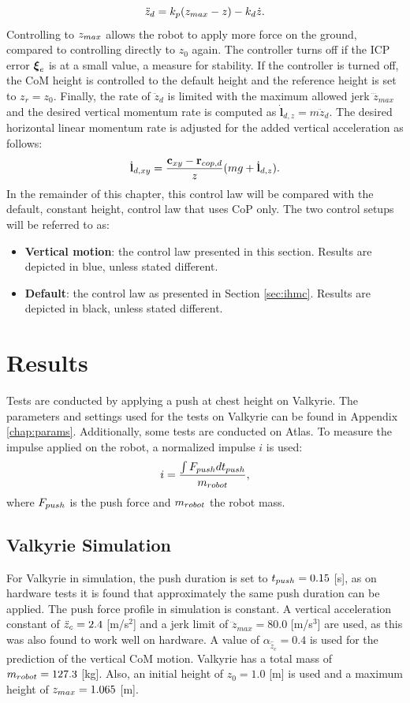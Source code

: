 \begin{equation}
	\ddot{z}_d = k_p(z_{max}-z)-k_d\dot{z}.
\end{equation}
Controlling to $z_{max}$ allows the robot to apply more force on the ground, compared to controlling directly to $z_0$ again. The controller turns off if the \ac{ICP} error $\boldsymbol{\xi}_e$ is at a small value, a measure for stability. If the controller is turned off, the \ac{CoM} height is controlled to the default height and the reference height is set to $z_r=z_0$. Finally, the rate of $\ddot{z}_d$ is limited with the maximum allowed jerk $\dddot{z}_{max}$ and the desired vertical momentum rate is computed as $\dot{\mathbf{l}}_{d,z}=m\ddot{z}_d$. The desired horizontal linear momentum rate is adjusted for the added vertical acceleration as follows:
\begin{equation}
    \dot{\mathbf{l}}_{d,xy}= \frac{\mathbf{c}_{xy}-\mathbf{r}_{cop,d}}{z}(mg+\dot{\mathbf{l}}_{d,z}).
\end{equation}
In the remainder of this chapter, this control law will be compared with the default, constant height, control law that uses \ac{CoP} only. The two control setups will be referred to as:
\begin{itemize}
\item \textbf{Vertical motion}: the control law presented in this section. Results are depicted in blue, unless stated different.
\item \textbf{Default}: the control law as presented in Section \ref{sec:ihmc}. Results are depicted in black, unless stated different.
\end{itemize}
\section{Results}
Tests are conducted by applying a push at chest height on Valkyrie. The parameters and settings used for the tests on Valkyrie can be found in Appendix \ref{chap:params}. Additionally, some tests are conducted on Atlas. To measure the impulse applied on the robot, a normalized impulse $i$ is used:
\begin{equation}
	i = \frac{\int F_{push} dt_{push}}{m_{robot}},
\end{equation}
where $F_{push}$ is the push force and $m_{robot}$ the robot mass.
\subsection{Valkyrie Simulation}
For Valkyrie in simulation, the push duration is set to $t_{push}=0.15$ [s], as on hardware tests it is found that approximately the same push duration can be applied. The push force profile in simulation is constant. A vertical acceleration constant of $\ddot{z}_{c}=2.4$ [m/s$^2$] and a jerk limit of $\dddot{z}_{max}=80.0$ [m/s$^3$] are used, as this was also found to work well on hardware. A value of $\alpha_{\hat{\ddot{z}}_{c}}=0.4$ is used for the prediction of the vertical \ac{CoM} motion. Valkyrie has a total mass of $m_{robot}=127.3$ [kg]. Also, an initial height of $z_0=1.0$ [m] is used and a maximum height of $z_{max}=1.065$ [m]. 

